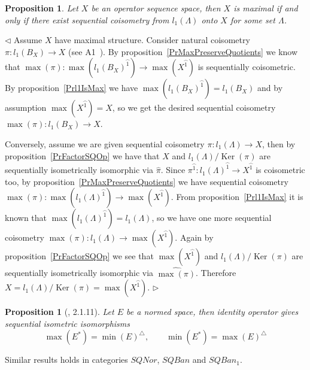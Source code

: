 \documentclass[12pt]{article}
\newtheorem{proposition}[theorem]{Proposition}
\newenvironment{proof}{\par $\triangleleft$}{$\triangleright$}
\begin{document}
\begin{proposition}\label{PrMaxIsQuotientOfl1} Let $X$ be an operator sequence 
space, then $X$ is maximal if and only if there exist sequential coisometry 
from $l_1(\Lambda)$ onto $X$ for some set $\Lambda$.
\end{proposition}
\begin{proof} 
Assume $X$ have maximal structure. Consider natural coisometry 
$\pi:l_1(B_X)\to X$ (see A1~\cite{DefFloTensNorOpId}). 
By proposition~\ref{PrMaxPreserveQuotients} we know 
that $\max(\pi):\max({l_1(B_X)}^{\wideparen{1}})\to\max(X^{\wideparen{1}})$ 
is sequentially coisometric. By proposition~\ref{Prl1IsMax} 
we have $\max({l_1(B_X)}^{\wideparen{1}})=l_1(B_X)$ 
and by assumption $\max(X^{\wideparen{1}})=X$, 
so we get the desired sequential coisometry $\max(\pi):l_1(B_X)\to X$.

Conversely, assume we are given sequential coisometry $\pi:l_1(\Lambda)\to X$, 
then by proposition~\ref{PrFactorSQOp} we have that $X$ 
and $l_1(\Lambda)/\operatorname{Ker}(\pi)$ are sequentially 
isometrically isomorphic via $\widehat{\pi}$. 
Since $\pi^{\wideparen{1}}:{l_1(\Lambda)}^{\wideparen{1}}\to X^{\wideparen{1}}$ 
is coisometric too, by proposition~\ref{PrMaxPreserveQuotients} we have 
sequential coisometry 
$\max(\pi):\max({l_1(\Lambda)}^{\wideparen{1}})\to \max(X^{\wideparen{1}})$. 
From proposition~\ref{Prl1IsMax} it is known that 
$\max({l_1(\Lambda)}^{\wideparen{1}})=l_1(\Lambda)$, so we have one more 
sequential coisometry $\max(\pi):l_1(\Lambda)\to\max(X^{\wideparen{1}})$. 
Again by proposition~\ref{PrFactorSQOp} we see that $\max(X^{\wideparen{1}})$ 
and $l_1(\Lambda)/\operatorname{Ker}(\pi)$ are sequentially isometrically 
isomorphic via $\widehat{\max(\pi)}$. 
Therefore $X=l_1(\Lambda)/\operatorname{Ker}(\pi)=\max(X^{\wideparen{1}})$.
\end{proof}

\begin{proposition}[\cite{LamOpFolgen}, 2.1.11]\label{PrDualityAndMinMax}
Let $E$ be a normed space, then identity operator gives sequential 
isometric isomorphisms
$$
\max(E^*)={\min(E)}^\triangle,
\qquad
\min(E^*)={\max(E)}^\triangle
$$
\end{proposition}

Similar results holds in categories $SQNor$, $SQBan$ and $SQBan_1$.
\end{document}
